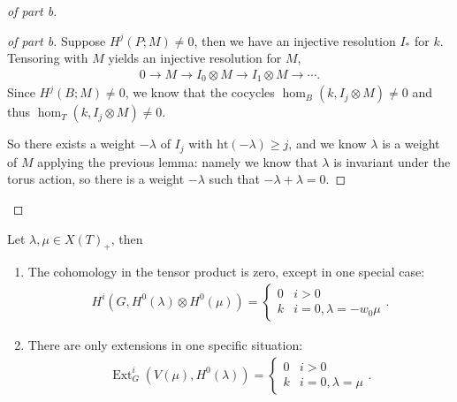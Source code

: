 \begin{proof}[of part b]

\begin{proof}[of part b]

Suppose \(H^j(P; M) \neq 0\), then we have an injective resolution
\(I_*\) for \(k\). Tensoring with \(M\) yields an injective resolution
for \(M\),
\begin{align*}   0 \to M \to I_0\otimes M \to I_1 \otimes M \to \cdots .\end{align*}
Since \(H^j(B; M) \neq 0\), we know that the cocycles
\(\hom_B(k, I_j\otimes M) \neq 0\) and thus
\(\hom_T(k, I_j\otimes M) \neq 0\).

So there exists a weight \(-\lambda\) of \(I_j\) with
\(\text{ht}(-\lambda) \geq j\), and we know \(\lambda\) is a weight of
\(M\) applying the previous lemma: namely we know that \(\lambda\) is
invariant under the torus action, so there is a weight \(-\lambda\) such
that \(-\lambda + \lambda = 0\).

\end{proof}

\end{proof}


\begin{theorem}[?]

\begin{theorem}[?]

Let \(\lambda, \mu \in X(T)_+\), then

\begin{enumerate}
\def\labelenumi{\arabic{enumi}.}
\item
  The cohomology in the tensor product is zero, except in one special
  case:
  \begin{align*}       H^i(G, H^0(\lambda) \otimes H^0(\mu))     =     \begin{cases}     0 & i>0 \\     k & i=0, \lambda = -w_0\mu     \end{cases}     .\end{align*}
\item
  There are only extensions in one specific situation:
  \begin{align*}       \operatorname{Ext}_G^i(V(\mu), H^0(\lambda)) =      \begin{cases}     0 & i> 0 \\     k & i=0, \lambda = \mu     \end{cases}     .\end{align*}
\end{enumerate}

\end{theorem}

\end{theorem}


